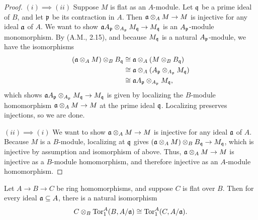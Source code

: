 \documentclass[a4paper]{article}
\begin{document}
\begin{enumerate} [label=\textbf{\arabic*.}, leftmargin=0em]
        \begin{proof}
          $(i) \implies (ii)$ Suppose $M$ is flat as an $A$-module.
          Let $\mathfrak{q}$ be a prime ideal of $B$, and let $\mathfrak{p}$ be its contraction in $A$.
          Then $\mathfrak{a} \otimes_A M \to M$ is injective for any ideal $\mathfrak{a}$ of $A$.
          We want to show $\mathfrak{a}A_{\mathfrak{p}} \otimes_{A_{\mathfrak{p}}} M_{\mathfrak{q}} \to M_{\mathfrak{q}}$ is an $A_{\mathfrak{p}}$-module monomorphism.
          By (A.M., 2.15), and because $M_{\mathfrak{q}}$ is a natural $A_{\mathfrak{p}}$-module, we have the isomorphisms
          \begin{align*}
            (\mathfrak{a} \otimes_A M) \otimes_B B_{\mathfrak{q}} & \cong \mathfrak{a} \otimes_A (M \otimes_B B_{\mathfrak{q}})                     \\
                                                        & \cong \mathfrak{a} \otimes_A (A_{\mathfrak{p}} \otimes_{A_{\mathfrak{p}}} M_{\mathfrak{q}}) \\
                                                        & \cong \mathfrak{a}A_{\mathfrak{p}} \otimes_{A_{\mathfrak{p}}} M_{\mathfrak{q}},
          \end{align*}
          which shows $\mathfrak{a} A_{\mathfrak{p}} \otimes_{A_{\mathfrak{p}}} M_{\mathfrak{q}} \to M_{\mathfrak{q}}$ is given by localizing the $B$-module homomorphism $\mathfrak{a} \otimes_A M \to M$ at the prime ideal $\mathfrak{q}$.
          Localizing preserves injections, so we are done.

          \noindent $(ii) \implies (i)$ We want to show $\mathfrak{a} \otimes_A M \to M$ is injective for any ideal $\mathfrak{a}$ of $A$.
          Because $M$ is a $B$-module, localizing at $\mathfrak{q}$ gives $(\mathfrak{a} \otimes_A M) \otimes_B B_{\mathfrak{q}} \to M_{\mathfrak{q}}$, which is injective by assumption and isomorphism of above.
          Thus, $\mathfrak{a} \otimes_A M \to M$ is injective as a $B$-module homomorphism, and therefore injective as an $A$-module homomorphism.
        \end{proof}

        \begin{lemma}
          Let $A \to B \to C$ be ring homomorphisms, and suppose $C$ is flat over $B$.
          Then for every ideal $\mathfrak{a} \subseteq A$, there is a natural isomorphism
          \begin{equation*}
            C \otimes_B \operatorname{Tor}_1^A(B, A / \mathfrak{a}) \cong \operatorname{Tor}_1^A(C, A / \mathfrak{a}).
          \end{equation*}
        \end{lemma}


\end{enumerate}
\end{document}

